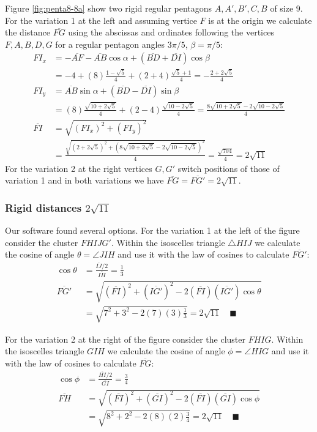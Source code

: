 \documentclass[11pt]{article}
\begin{document}
Figure \ref{fig:penta8-8a} show two rigid regular pentagons $A,A',B',C,B$ of size $9$. For the variation 1 at the left and assuming vertice $F$ is at the origin we calculate the distance $\overline{FG}$ using the abscissas and ordinates following the vertices $F,A,B,D,G$ for a regular pentagon angles $3\pi/5$, $\beta=\pi/5$:
\begin{align}
FI_x &= -\overline{AF} - \overline{AB}\cos\alpha + (\overline{BD} + \overline{DI})\cos\beta\nonumber\\
 &= -4 + (8)\frac{1-\sqrt5}4 + (2+4)\frac{\sqrt5+1}4 = -\frac{2+2\sqrt5}4\\
FI_y &= \overline{AB}\sin\alpha + (\overline{BD}-\overline{DI})\sin\beta\nonumber\\
 &= (8)\frac{\sqrt{10+2\sqrt5}}4 + (2-4)\frac{\sqrt{10-2\sqrt5}}4
 = \frac{8\sqrt{10+2\sqrt5} - 2\sqrt{10-2\sqrt5}}4\\
\overline{FI} &= \sqrt{(FI_x)^2 + (FI_y)^2}\nonumber\\
 &= \frac{\sqrt{(2+2\sqrt5)^2 + (8\sqrt{10+2\sqrt5} - 2\sqrt{10-2\sqrt5})^2}}4
 = \frac{\sqrt{704}}4 = 2\sqrt{11}
\end{align}
For the variation 2 at the right vertices $G,G'$ switch positions of those of variation 1 and in both variations we have $\overline{FG} = \overline{FG'} = 2\sqrt{11}$.


\subsubsection{Rigid distances $2\sqrt{11}$}

Our software found several options. For the variation 1 at the left of the figure consider the cluster $FHIJG'$. Within the isoscelles triangle $\triangle{HIJ}$ we calculate the cosine of angle $\theta = \angle{JIH}$ and use it with the law of cosines to calculate $\overline{FG'}$:
\begin{align}
\cos\theta &= \frac{\overline{IJ}/2}{\overline{IH}} = \frac{1}3 \nonumber\\
\overline{FG'} &= \sqrt{(\overline{FI})^2 + (\overline{IG'})^2 
 - 2(\overline{FI})(\overline{IG'})\cos\theta} \nonumber\\
 &= \sqrt{7^2 + 3^2 - 2(7)(3)\frac{1}3} = 2\sqrt{11} \quad\blacksquare
\end{align}

For the variation 2 at the right of the figure consider the cluster $FHIG$. Within the isoscelles triangle $GIH$ we calculate the cosine of angle $\phi = \angle{HIG}$ and use it with the law of cosines to calculate $\overline{FG}$:
\begin{align}
\cos\phi &= \frac{\overline{HI}/2}{\overline{GI}} = \frac{3}4 \nonumber\\
\overline{FH} &= \sqrt{(\overline{FI})^2 + (\overline{GI})^2
 - 2(\overline{FI})(\overline{GI})\cos\phi} \nonumber\\
 &= \sqrt{8^2 + 2^2 - 2(8)(2)\frac{3}4} = 2\sqrt{11} \quad\blacksquare
\end{align}
\end{document}
